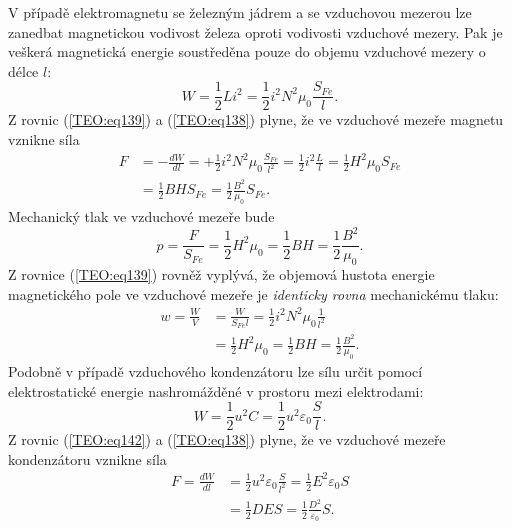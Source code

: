       V případě elektromagnetu se železným jádrem a se vzduchovou mezerou lze zanedbat magnetickou 
      vodivost železa oproti vodivosti vzduchové mezery. Pak je veškerá magnetická energie 
      soustředěna pouze do objemu vzduchové mezery o délce \(l\):
      \begin{equation}\label{TEO:eq139}
        W =\frac{1}{2}Li^2 = \frac{1}{2}i^2N^2\mu_0\frac{S_{Fe}}{l}.
      \end{equation}
      Z rovnic (\ref{TEO:eq139}) a (\ref{TEO:eq138}) plyne, že ve vzduchové mezeře 
      magnetu vznikne síla
      \begin{align}\label{TEO:eq140}
         F &= -\frac{dW}{dl} 
            = +\frac{1}{2}i^2N^2\mu_0\frac{S_{Fe}}{l^2}
            =  \frac{1}{2}i^2\frac{L}{l} = \frac{1}{2}H^2\mu_0S_{Fe}              \nonumber \\
           &=  \frac{1}{2}BHS_{Fe} = \frac{1}{2}\frac{B^2}{\mu_0}S_{Fe}.
      \end{align}
      Mechanický tlak ve vzduchové mezeře bude
      \begin{equation}\label{TEO:eq141}
        p = \frac{F}{S_{Fe}} = \frac{1}{2}H^2\mu_0 = \frac{1}{2}BH = \frac{1}{2}\frac{B^2}{\mu_0}.
      \end{equation}
      Z rovnice (\ref{TEO:eq139}) rovněž vyplývá, že objemová hustota energie magnetického 
      pole ve vzduchové mezeře je \emph{identicky rovna} mechanickému tlaku:
      \begin{align*}
        w  = \frac{W}{V} 
          &= \frac{W}{S_{Fe}l} = \frac{1}{2}i^2N^2\mu_0\frac{1}{l^2}              \\
          &= \frac{1}{2}H^2\mu_0 = \frac{1}{2}BH = \frac{1}{2}\frac{B^2}{\mu_0}.
      \end{align*}
      Podobně v případě vzduchového kondenzátoru lze sílu určit pomocí elektrostatické energie 
      nashromážděné v prostoru mezi elektrodami:
      \begin{equation}\label{TEO:eq142}
        W = \frac{1}{2}u^2C = \frac{1}{2}u^2\varepsilon_0\frac{S}{l}.
      \end{equation}
      Z rovnic (\ref{TEO:eq142}) a (\ref{TEO:eq138}) plyne, že ve vzduchové mezeře 
      kondenzátoru vznikne síla
      \begin{align*}
        F  = \frac{dW}{dl} 
          &= \frac{1}{2}u^2\varepsilon_0\frac{S}{l^2}
           = \frac{1}{2}E^2\varepsilon_0S                                  \\
          &= \frac{1}{2}DES           
           = \frac{1}{2}\frac{D^2}{\varepsilon_0}S.
      \end{align*}
